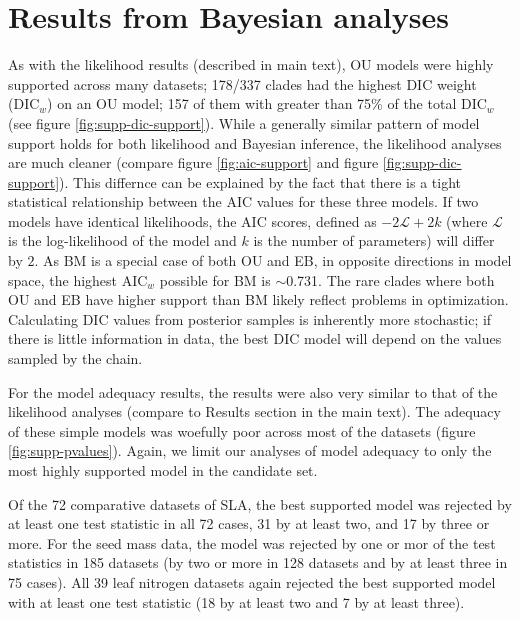 \documentclass[a4paper,11pt]{article}
\begin{document}
 
\newpage



\newpage

\section{Results from Bayesian analyses}
As with the likelihood results (described in main text), OU models were highly supported across many datasets; 
178/337 clades had the highest DIC weight (DIC$_w$) on an OU model; 157 of them with greater than 75\% of the total DIC$_w$ (see figure \ref{fig:supp-dic-support}). While a generally similar pattern of model support holds for both likelihood and Bayesian inference, the likelihood analyses are much cleaner (compare figure \ref{fig:aic-support} and figure \ref{fig:supp-dic-support}). This differnce can be explained by the fact that there is a tight statistical relationship between the AIC values for these three models. If two models have identical likelihoods, the AIC scores, defined as $-2\mathcal{L} + 2k$ (where $\mathcal{L}$ is the log-likelihood of the model and $k$ is the number of parameters) will differ by $2$. As BM is a special case of both OU and EB, in opposite directions in model space, the highest AIC$_w$ possible for BM is $\sim$0.731. The rare clades where both OU and EB have higher support than BM likely reflect problems in optimization. Calculating DIC values from posterior samples is inherently more stochastic; if there is little information in data, the best DIC model will depend on the values sampled by the chain. 

For the model adequacy results, the results were also very similar to that of the likelihood analyses (compare to Results section in the main text). The adequacy of these simple models was woefully poor across most of the datasets (figure \ref{fig:supp-pvalues}). Again, we limit our analyses of model adequacy to only the most highly supported model in the candidate set.

Of the 72 comparative datasets of SLA, the best supported model was rejected by at least one test statistic in all 72 cases, 31 by at least two, and 17 by three or more.
For the seed mass data, the model was rejected by one or mor of the test statistics in 185 datasets (by two or more in 128 datasets and by at least three in 75 cases).
All 39 leaf nitrogen datasets again rejected the best supported model with at least one test statistic (18 by at least two and 7 by at least three).
\end{document}
